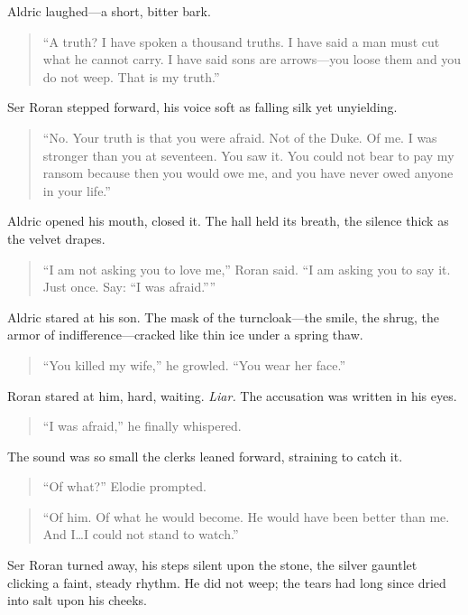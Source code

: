 \documentclass[11pt,twoside]{book}
\begin{document}
Aldric laughed---a short, bitter bark.

\begin{quote}
``A truth? I have spoken a thousand truths. I have said a man must cut what he cannot carry. I have said sons are arrows---you loose them and you do not weep. That is my truth.''
\end{quote}

Ser Roran stepped forward, his voice soft as falling silk yet unyielding.

\begin{quote}
``No. Your truth is that you were afraid. Not of the Duke. Of me. I was stronger than you at seventeen. You saw it. You could not bear to pay my ransom because then you would owe me, and you have never owed anyone in your life.''
\end{quote}

Aldric opened his mouth, closed it. The hall held its breath, the silence thick as the velvet drapes.

\begin{quote}
``I am not asking you to love me,'' Roran said. ``I am asking you to say it. Just once. Say: ``I was afraid.''''
\end{quote}

Aldric stared at his son. The mask of the turncloak---the smile, the shrug, the armor of indifference---cracked like thin ice under a spring thaw.

\begin{quote}
``You killed my wife,'' he growled. ``You wear her face.''
\end{quote}

Roran stared at him, hard, waiting.  \textit{Liar.} The accusation was written in his eyes.

\begin{quote}
    ``I was afraid,'' he finally whispered.
\end{quote}

The sound was so small the clerks leaned forward, straining to catch it.

\begin{quote}
``Of what?'' Elodie prompted.
\end{quote}

\begin{quote}
``Of him. Of what he would become. He would have been better than me. And I\dots I could not stand to watch.''
\end{quote}

Ser Roran turned away, his steps silent upon the stone, the silver gauntlet clicking a faint, steady rhythm. He did not weep; the tears had long since dried into salt upon his cheeks.
\end{document}
